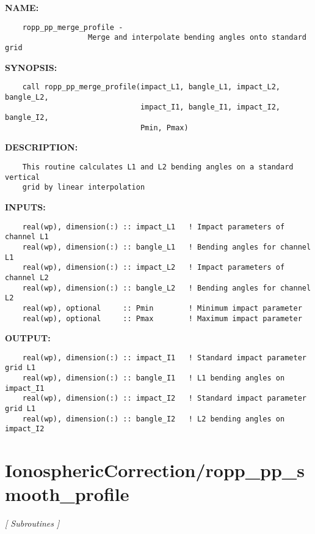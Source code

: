 \label{ch:robo30}
\label{ch:IonosphericCorrection_ropp_pp_merge_profile}
\textbf{NAME:}\hspace{0.08in}\begin{Verbatim}
    ropp_pp_merge_profile - 
                   Merge and interpolate bending angles onto standard grid
\end{Verbatim}
\textbf{SYNOPSIS:}\hspace{0.08in}\begin{Verbatim}
    call ropp_pp_merge_profile(impact_L1, bangle_L1, impact_L2, bangle_L2, 
                               impact_I1, bangle_I1, impact_I2, bangle_I2,
                               Pmin, Pmax)                               
\end{Verbatim}
\textbf{DESCRIPTION:}\hspace{0.08in}\begin{Verbatim}
    This routine calculates L1 and L2 bending angles on a standard vertical 
    grid by linear interpolation
\end{Verbatim}
\textbf{INPUTS:}\hspace{0.08in}\begin{Verbatim}
    real(wp), dimension(:) :: impact_L1   ! Impact parameters of channel L1
    real(wp), dimension(:) :: bangle_L1   ! Bending angles for channel L1
    real(wp), dimension(:) :: impact_L2   ! Impact parameters of channel L2
    real(wp), dimension(:) :: bangle_L2   ! Bending angles for channel L2
    real(wp), optional     :: Pmin        ! Minimum impact parameter
    real(wp), optional     :: Pmax        ! Maximum impact parameter
\end{Verbatim}
\textbf{OUTPUT:}\hspace{0.08in}\begin{Verbatim}
    real(wp), dimension(:) :: impact_I1   ! Standard impact parameter grid L1
    real(wp), dimension(:) :: bangle_I1   ! L1 bending angles on impact_I1
    real(wp), dimension(:) :: impact_I2   ! Standard impact parameter grid L1
    real(wp), dimension(:) :: bangle_I2   ! L2 bending angles on impact_I2
\end{Verbatim}
\section{IonosphericCorrection/ropp\_pp\_smooth\_profile}
\textsl{[ Subroutines ]}

